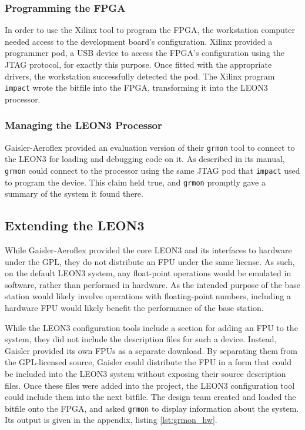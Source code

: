 \subsubsection{Programming the \ac{FPGA}}
In order to use the Xilinx tool to program the \ac{FPGA}, the workstation
computer needed access to the development board's configuration. Xilinx
provided a programmer pod, a \ac{USB} device to access the \ac{FPGA}'s
configuration using the \ac{JTAG} protocol, for exactly this purpose. Once
fitted with the appropriate drivers, the workstation successfully detected
the pod. The Xilinx program \texttt{impact} wrote the bitfile into the
\ac{FPGA}, transforming it into the LEON3 processor.

\subsubsection{Managing the LEON3 Processor}
Gaisler-Aeroflex provided an evaluation version of their \texttt{grmon}
tool to connect to the LEON3 for loading and debugging code on it. As
described in its manual, \texttt{grmon} could connect to the processor
using the same \ac{JTAG} pod that \texttt{impact} used to program the
device. This claim held true, and \texttt{grmon} promptly gave a summary of
the system it found there.

\subsection{Extending the LEON3}
While Gaisler-Aeroflex provided the core LEON3 and its interfaces to
hardware under the \ac{GPL}, they do not distribute an \ac{FPU} under the
same license. As such, on the default LEON3 system, any float-point
operations would be emulated in software, rather than performed in
hardware. As the intended purpose of the base station would likely involve
operations with floating-point numbers, including a hardware \ac{FPU} would
likely benefit the performance of the base station.

While the LEON3 configuration tools include a section for adding an
\ac{FPU} to the system, they did not include the description files for such
a device. Instead, Gaisler provided its own \ac{FPU}s as a separate
download. By separating them from the \ac{GPL}-licensed source, Gaisler
could distribute the \ac{FPU} in a form that could be included into the
LEON3 system without exposing their source description files. Once these
files were added into the project, the LEON3 configuration tool could
include them into the next bitfile. The design team created and loaded the
bitfile onto the \ac{FPGA}, and asked \texttt{grmon} to display information
about the system. Its output is given in the appendix, listing
\ref{lst:grmon_hw}.

